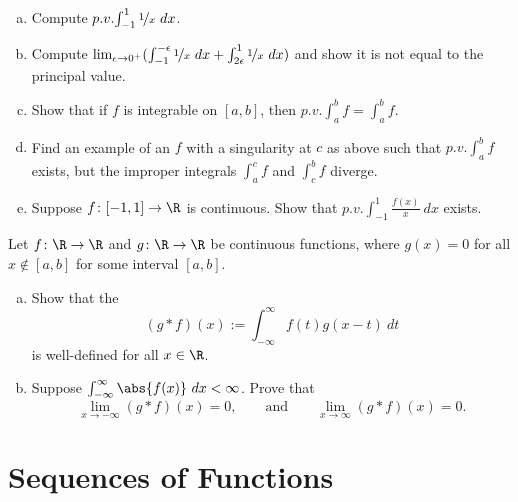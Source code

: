\documentclass[12pt]{book}
\begin{document}
\begin{exercise}
\begin{enumerate}[a)]
 \item Compute $p.v.\!\int_{-1}^1 \nicefrac{1}{x}~dx$.
 \item Compute
$\lim_{\epsilon\to 0^+}
( \int_{-1}^{-\epsilon} \nicefrac{1}{x}~dx + 
\int_{2\epsilon}^1 \nicefrac{1}{x}~dx )$ and show it is not equal
to the principal value.
 \item Show that if $f$ is integrable on $[a,b]$, then
$p.v.\!\int_a^b f = \int_a^b f$.
 \item Find an example of an $f$ with a singularity at $c$ as above
such that 
$p.v.\!\int_a^b f$ exists, but the improper integrals
$\int_a^c f$ and $\int_c^b f$ diverge.
 \item Suppose 
$f \colon [-1,1] \to \R$ is continuous.
Show that
$p.v.\!\int_{-1}^1 \frac{f(x)}{x}~dx$ exists.
\end{enumerate}
\end{exercise}

\begin{exercise}
Let $f \colon \R \to \R$ and 
$g \colon \R \to \R$ be continuous functions, where
$g(x) = 0$ for all $x \notin [a,b]$ for some interval $[a,b]$.
\begin{enumerate}[a)]
 \item Show that the
\emph{}
\begin{equation*}
(g * f)(x) := \int_{-\infty}^\infty f(t)g(x-t)~dt 
\end{equation*}
is well-defined for all $x \in \R$.
  \item Suppose $\int_{-\infty}^\infty \abs{f(x)}~dx < \infty$.
Prove that
\begin{equation*}
\lim_{x \to -\infty} (g * f)(x) = 0, \qquad \text{and} \qquad
\lim_{x \to \infty} (g * f)(x) = 0 .
\end{equation*}
\end{enumerate}
\end{exercise}


\chapter{Sequences of Functions} \label{fs:chapter}
\end{document}

